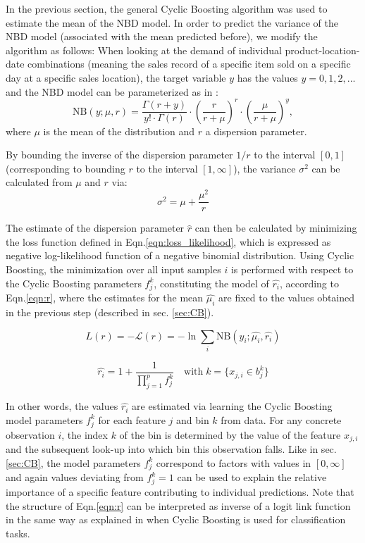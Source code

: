 \documentclass[BCOR=1mm, DIV=calc,10pt,
twoside=true,
twocolumn,
headings=normal]{scrartcl}
\newcommand{\eqn}{Eqn.}
\begin{document}
In the previous section, the general Cyclic Boosting algorithm was used to estimate the mean of the NBD model. In order to predict the variance of the NBD model (associated with the mean predicted before), we modify the algorithm as follows: When looking at the demand of individual product-location-date combinations (meaning the sales record of a specific item sold on a specific day at a specific sales location), the target variable $y$ has the values $y = 0, 1, 2, ...$ and the NBD model can be parameterized as in \cite{hilbe2011negative}:
\begin{equation} \label{eqn:nbinom}
\mathrm{NB}(y; \mu, r) = \frac{\Gamma(r + y)}{y! \cdot \Gamma(r)} \cdot \left(\frac{r}{r + \mu}\right)^r \cdot \left(\frac{\mu}{r + \mu}\right)^y,
\end{equation}
where $\mu$ is the mean of the distribution and $r$ a dispersion parameter.

By bounding the inverse of the dispersion parameter $1/r$ to the interval $[0, 1]$ (corresponding to bounding $r$ to the interval $[1, \infty]$), the variance $\sigma^2$ can be calculated from $\mu$ and $r$ via:
\begin{equation} \label{eqn:variance_r}
\sigma^2 = \mu + \frac{\mu^2}{r}
\end{equation}

The estimate of the dispersion parameter $\hat{r}$ can then be calculated by minimizing the loss function defined in \eqn \eqref{eqn:loss_likelihood}, which is expressed as negative log-likelihood function of a negative binomial distribution. Using Cyclic Boosting, the minimization over all input samples $i$ is performed with respect to the Cyclic Boosting parameters $f^k_j$, constituting the model of $\hat{r_i}$, according to \eqn \eqref{eqn:r}, where the estimates for the mean $\hat{\mu_i}$ are fixed to the values obtained in the previous step (described in sec. \ref{sec:CB}).

\begin{equation} \label{eqn:loss_likelihood}
L(r) = -\mathcal{L}(r) = -\ln \sum_i \mathrm{NB}(y_i; \hat{\mu_i}, \hat{r_i})
\end{equation}

\begin{equation} \label{eqn:r}
\hat{r_i} = 1 +  \frac{1}{\prod \limits_{j=1}^p f^k_j} \quad \text{with}\; k=\{ x_{j,i} \in b^k_j\}
\end{equation}

In other words, the values $\hat{r_i}$ are estimated via learning the Cyclic Boosting model parameters $f^k_j$ for each feature $j$ and bin $k$ from data. For any concrete observation $i$, the index $k$ of the bin is determined by the value of the feature $x_{j,i}$ and the subsequent look-up into which bin this observation falls. Like in sec. \ref{sec:CB}, the model parameters $f^k_j$ correspond to factors with values in $[0, \infty]$ and again values deviating from $f^k_j=1$ can be used to explain the relative importance of a specific feature contributing to individual predictions. Note that the structure of \eqn \eqref{eqn:r} can be interpreted as inverse of a logit link function in the same way as explained in \cite{Wick2019} when Cyclic Boosting is used for classification tasks.
\end{document}
